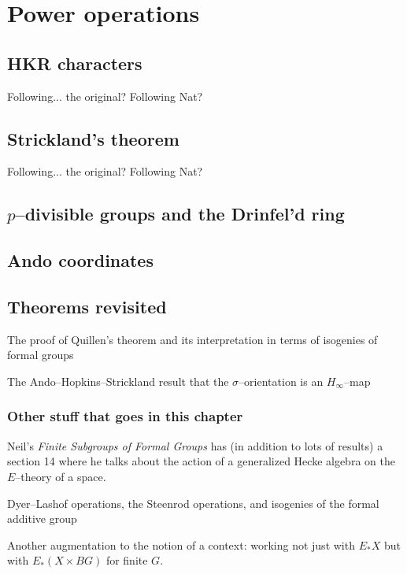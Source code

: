 
\chapter{Power operations}

\section{HKR characters}

Following... the original? Following Nat?

\section{Strickland's theorem}

Following... the original? Following Nat?

\section{$p$--divisible groups and the Drinfel'd ring}

\section{Ando coordinates}

\section{Theorems revisited}

The proof of Quillen's theorem and its interpretation in terms of isogenies of formal groups

The Ando--Hopkins--Strickland result that the $\sigma$--orientation is an $H_\infty$--map




\subsection*{Other stuff that goes in this chapter}

Neil's \textit{Finite Subgroups of Formal Groups} has (in addition to lots of results) a section 14 where he talks about the action of a generalized Hecke algebra on the $E$--theory of a space.

Dyer--Lashof operations, the Steenrod operations, and isogenies of the formal additive group 

Another augmentation to the notion of a context: working not just with $E_* X$ but with $E_*(X \times BG)$ for finite $G$.
